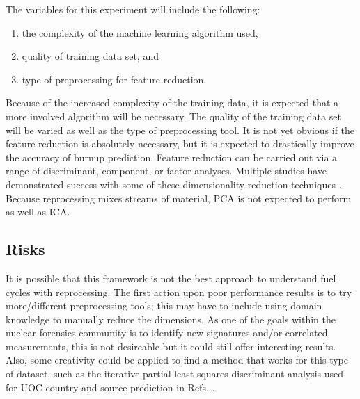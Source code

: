 The variables for this experiment will include the following:
\begin{enumerate}
  \itemsep-0.75em
  \item the complexity of the machine learning algorithm used,
  \item quality of training data set, and 
  \item type of preprocessing for feature reduction.
\end{enumerate}
Because of the increased complexity of the training data, it is expected that a
more involved algorithm will be necessary.  The quality of the training data
set will be varied as well as the type of preprocessing tool.  It is not yet
obvious if the feature reduction is absolutely necessary, but it is expected to
drastically improve the accuracy of burnup prediction.  Feature reduction can
be carried out via a range of discriminant, component, or factor analyses.
Multiple studies have demonstrated success with some of these dimensionality
reduction techniques \cite{nicolaou_2006, nicolaou_2009, nicolaou_2014,
robel_2009, pu_discrimination, jones_viz_2014, jones_snf_2014}. Because
reprocessing mixes streams of material, \gls{PCA} is not expected to perform as
well as \gls{ICA}.

\subsection*{Risks}

It is possible that this framework is not the best approach to understand fuel
cycles with reprocessing. The first action upon poor performance results is to
try more/different preprocessing tools; this may have to include using domain
knowledge to manually reduce the dimensions. As one of the goals within the
nuclear forensics community is to identify new signatures and/or correlated
measurements, this is not desireable but it could still offer interesting
results. Also, some creativity could be applied to find a method that works for
this type of dataset, such as the iterative partial least squares discriminant
analysis used for \gls{UOC} country and source prediction in Refs.
\cite{robel_2009, pu_discrimination}.
